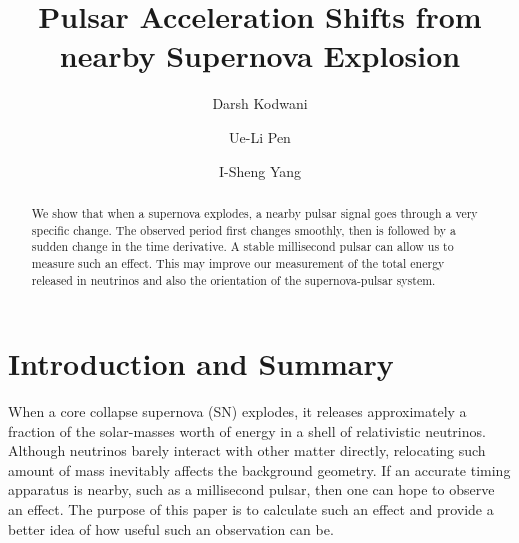 \documentclass[aps,showpacs,onecolumn,floats,prd,superscriptaddress,nofootinbib]{revtex4}
\begin{document}
\title{Pulsar Acceleration Shifts from nearby Supernova Explosion}

\author{Darsh Kodwani}

\author{Ue-Li Pen}

\author{I-Sheng Yang}

\begin{abstract}
We show that when a supernova explodes, a nearby pulsar signal goes through a very specific change. The observed period first changes smoothly, then is followed by a sudden change in the time derivative. A stable millisecond pulsar can allow us to measure such an effect. This may improve our measurement of the total energy released in neutrinos and also the orientation of the supernova-pulsar system. 
\end{abstract}

\maketitle

\section{Introduction and Summary}

When a core collapse supernova (SN) explodes, it releases approximately a fraction of the solar-masses worth of energy in a shell of relativistic neutrinos. Although neutrinos barely interact with other matter directly, relocating such amount of mass inevitably affects the background geometry. If an accurate timing apparatus is nearby, such as a millisecond pulsar, then one can hope to observe an effect. The purpose of this paper is to calculate such an effect and provide a better idea of how useful such an observation can be.
\end{document}
